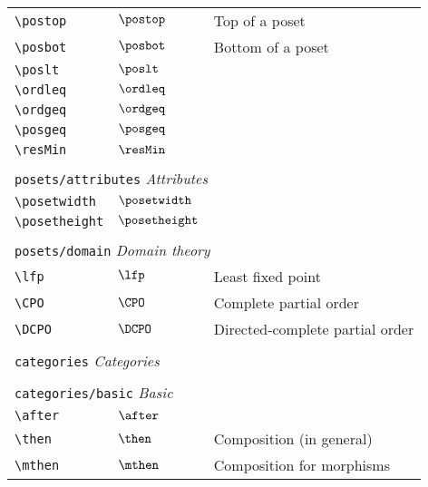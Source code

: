 \begin{longtable}{lll}
 {\color[rgb]{0.5,0.5,0.5}\texttt{\textbackslash postop}} & $\postop$ &  Top of a poset\\ 
 {\color[rgb]{0.5,0.5,0.5}\texttt{\textbackslash posbot}} & $\posbot$ &  Bottom of a poset\\ 
 {\color[rgb]{0.5,0.5,0.5}\texttt{\textbackslash poslt}} & $\poslt$ & \\ 
 {\color[rgb]{0.5,0.5,0.5}\texttt{\textbackslash ordleq}} & $\ordleq$ & \\ 
 {\color[rgb]{0.5,0.5,0.5}\texttt{\textbackslash ordgeq}} & $\ordgeq$ & \\ 
 {\color[rgb]{0.5,0.5,0.5}\texttt{\textbackslash posgeq}} & $\posgeq$ & \\ 
 {\color[rgb]{0.5,0.5,0.5}\texttt{\textbackslash resMin}} & $\resMin$ & \\ 
  &  & \\ 
 \multicolumn{3}{l}{{\color[rgb]{0.5,0.5,0.5}\texttt{posets/attributes}} \emph{Attributes}}\\ 
 \hline
{\color[rgb]{0.5,0.5,0.5}\texttt{\textbackslash posetwidth}} & $\posetwidth$ & \\ 
 {\color[rgb]{0.5,0.5,0.5}\texttt{\textbackslash posetheight}} & $\posetheight$ & \\ 
  &  & \\ 
 \multicolumn{3}{l}{{\color[rgb]{0.5,0.5,0.5}\texttt{posets/domain}} \emph{Domain theory}}\\ 
 \hline
{\color[rgb]{0.5,0.5,0.5}\texttt{\textbackslash lfp}} & $\lfp$ &  Least fixed point\\ 
 {\color[rgb]{0.5,0.5,0.5}\texttt{\textbackslash CPO}} & $\CPO$ &  Complete partial order\\ 
 {\color[rgb]{0.5,0.5,0.5}\texttt{\textbackslash DCPO}} & $\DCPO$ &  Directed-complete partial order\\ 
  &  & \\ 
 \multicolumn{3}{l}{{\color[rgb]{0.5,0.5,0.5}\texttt{categories}} \emph{Categories}}\\ 
 \hline
\hline
 &  & \\ 
 \multicolumn{3}{l}{{\color[rgb]{0.5,0.5,0.5}\texttt{categories/basic}} \emph{Basic}}\\ 
 \hline
{\color[rgb]{0.5,0.5,0.5}\texttt{\textbackslash after}} & $\after$ & \\ 
 {\color[rgb]{0.5,0.5,0.5}\texttt{\textbackslash then}} & $\then$ &  Composition (in general)\\ 
 {\color[rgb]{0.5,0.5,0.5}\texttt{\textbackslash mthen}} & $\mthen$ &  Composition for morphisms\\ 

\end{longtable}
